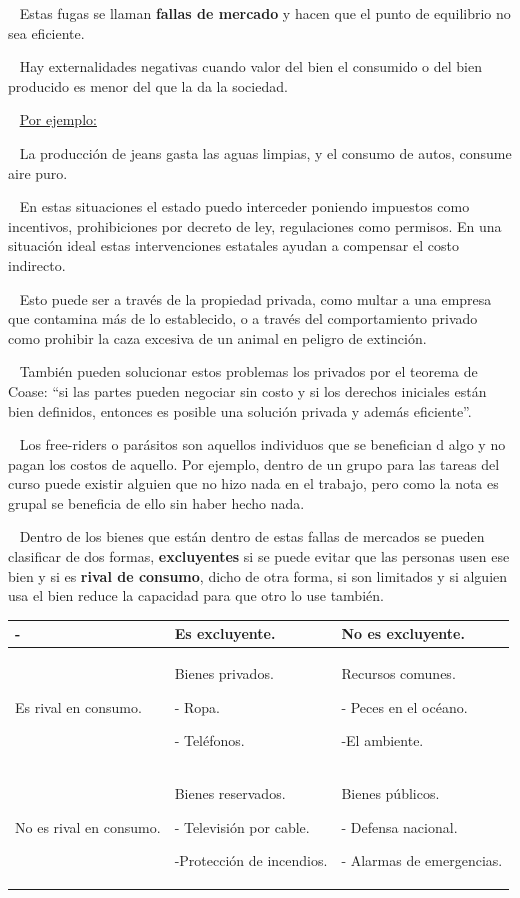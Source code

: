 \documentclass[
  letterpaper,
  DIV=11,
  numbers=noendperiod]{scrreport}
\begin{document}
~ Estas fugas se llaman \textbf{fallas de mercado} y hacen que el punto
de equilibrio no sea eficiente.

~ Hay externalidades negativas cuando valor del bien el consumido o del
bien producido es menor del que la da la sociedad.

~ \ul{Por ejemplo:}

~ La producción de jeans gasta las aguas limpias, y el consumo de autos,
consume aire puro.

~ En estas situaciones el estado puedo interceder poniendo impuestos
como incentivos, prohibiciones por decreto de ley, regulaciones como
permisos. En una situación ideal estas intervenciones estatales ayudan a
compensar el costo indirecto.

~ Esto puede ser a través de la propiedad privada, como multar a una
empresa que contamina más de lo establecido, o a través del
comportamiento privado como prohibir la caza excesiva de un animal en
peligro de extinción.

~ También pueden solucionar estos problemas los privados por el teorema
de Coase: ``si las partes pueden negociar sin costo y si los derechos
iniciales están bien definidos, entonces es posible una solución privada
y además eficiente''.

~ Los free-riders o parásitos son aquellos individuos que se benefician
d algo y no pagan los costos de aquello. Por ejemplo, dentro de un grupo
para las tareas del curso puede existir alguien que no hizo nada en el
trabajo, pero como la nota es grupal se beneficia de ello sin haber
hecho nada.

~ Dentro de los bienes que están dentro de estas fallas de mercados se
pueden clasificar de dos formas, \textbf{excluyentes} si se puede evitar
que las personas usen ese bien y si es \textbf{rival de consumo}, dicho
de otra forma, si son limitados y si alguien usa el bien reduce la
capacidad para que otro lo use también.

\begin{table}[h]
    \centering
    \begin{tabular}{|p{30mm}|p{30mm}|p{30mm}|}
        \hline
        - & Es excluyente. & No es excluyente. \\ \hline
        Es rival en consumo. & Bienes privados. \par - Ropa. \par - Teléfonos. & Recursos comunes. \par - Peces en el océano. \par -El ambiente. \\ \hline
        No es rival en consumo. & Bienes reservados. \par - Televisión por cable. \par -Protección de incendios. \par & Bienes públicos. \par - Defensa nacional. \par - Alarmas de emergencias. \\ \hline
    \end{tabular}
    
\end{table}
\end{document}
